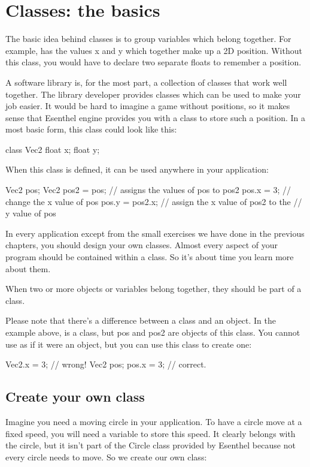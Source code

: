 \chapter{Classes: the basics}

The basic idea behind classes is to group variables which belong together. For example,  has the values x and y which together make up a 2D position. Without this class, you would have to declare two separate floats to remember a position.

A software library is, for the most part, a collection of classes that work well together. The library developer provides classes which can be used to make your job easier. It would be hard to imagine a game without positions, so it makes sense that Esenthel engine provides you with a class to store such a position. In a most basic form, this class could look like this:

\begin{code}
class Vec2 {
	float x;
	float y;
}  
\end{code}

When this class is defined, it can be used anywhere in your application:

\begin{code}
Vec2 pos;
Vec2 pos2 = pos; // assigns the values of pos to pos2
pos.x = 3;       // change the x value of pos 
pos.y = pos2.x;  // assign the x value of pos2 to the
				 // y value of pos
\end{code}

In every application except from the small exercises we have done in the previous chapters, you should design your own classes. Almost every aspect of your program should be contained within a class. So it's about time you learn more about them.

\begin{note}
When two or more objects or variables belong together, they should be part of a class.
\end{note}

Please note that there's a difference between a class and an object. In the example above,  is a class, but pos and pos2 are objects of this class. You cannot use  as if it were an object, but you can use this class to create one:

\begin{code}
Vec2.x = 3; // wrong!
Vec2 pos;
pos.x = 3; // correct.
\end{code}

\section{Create your own class}
Imagine you need a moving circle in your application. To have a circle move at a fixed speed, you will need a variable to store this speed. It clearly belongs with the circle, but it isn't part of the Circle class provided by Esenthel because not every circle needs to move. So we create our own class:

